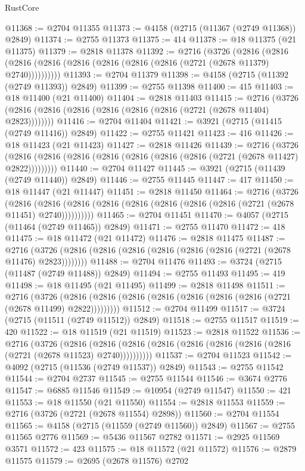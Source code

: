\begin{lexlean}{RustCore}
\begin{coremodule}
@11368 := @2704 @11355
@11373 := @4158 (@2715 (@11367 (@2749 @11368)) @2849)
@11374 := @2755 @11373
@11375 := 414
@11378 := @18 @11375 (@21 @11375)
@11379 := @2818 @11378
@11392 := @2716
    (@3726
      (@2816 (@2816 (@2816 (@2816 (@2816 (@2816 (@2816 (@2816 (@2721 (@2678 @11379) @2740))))))))))
@11393 := @2704 @11379
@11398 := @4158 (@2715 (@11392 (@2749 @11393)) @2849)
@11399 := @2755 @11398
@11400 := 415
@11403 := @18 @11400 (@21 @11400)
@11404 := @2818 @11403
@11415 := @2716 (@3726 (@2816 (@2816 (@2816 (@2816 (@2816 (@2816 (@2721 (@2678 @11404) @2823))))))))
@11416 := @2704 @11404
@11421 := @3921 (@2715 (@11415 (@2749 @11416)) @2849)
@11422 := @2755 @11421
@11423 := 416
@11426 := @18 @11423 (@21 @11423)
@11427 := @2818 @11426
@11439 := @2716
    (@3726 (@2816 (@2816 (@2816 (@2816 (@2816 (@2816 (@2816 (@2721 (@2678 @11427) @2822)))))))))
@11440 := @2704 @11427
@11445 := @3921 (@2715 (@11439 (@2749 @11440)) @2849)
@11446 := @2755 @11445
@11447 := 417
@11450 := @18 @11447 (@21 @11447)
@11451 := @2818 @11450
@11464 := @2716
    (@3726
      (@2816 (@2816 (@2816 (@2816 (@2816 (@2816 (@2816 (@2816 (@2721 (@2678 @11451) @2740))))))))))
@11465 := @2704 @11451
@11470 := @4057 (@2715 (@11464 (@2749 @11465)) @2849)
@11471 := @2755 @11470
@11472 := 418
@11475 := @18 @11472 (@21 @11472)
@11476 := @2818 @11475
@11487 := @2716 (@3726 (@2816 (@2816 (@2816 (@2816 (@2816 (@2816 (@2721 (@2678 @11476) @2823))))))))
@11488 := @2704 @11476
@11493 := @3724 (@2715 (@11487 (@2749 @11488)) @2849)
@11494 := @2755 @11493
@11495 := 419
@11498 := @18 @11495 (@21 @11495)
@11499 := @2818 @11498
@11511 := @2716
    (@3726 (@2816 (@2816 (@2816 (@2816 (@2816 (@2816 (@2816 (@2721 (@2678 @11499) @2822)))))))))
@11512 := @2704 @11499
@11517 := @3724 (@2715 (@11511 (@2749 @11512)) @2849)
@11518 := @2755 @11517
@11519 := 420
@11522 := @18 @11519 (@21 @11519)
@11523 := @2818 @11522
@11536 := @2716
    (@3726
      (@2816 (@2816 (@2816 (@2816 (@2816 (@2816 (@2816 (@2816 (@2721 (@2678 @11523) @2740))))))))))
@11537 := @2704 @11523
@11542 := @4092 (@2715 (@11536 (@2749 @11537)) @2849)
@11543 := @2755 @11542
@11544 := @2704 @2737
@11545 := @2755 @11544
@11546 := @3674 @2776
@11547 := @6885 @11546
@11549 := @10954 (@2749 @11547)
@11550 := 421
@11553 := @18 @11550 (@21 @11550)
@11554 := @2818 @11553
@11559 := @2716 (@3726 (@2721 (@2678 @11554) @2898))
@11560 := @2704 @11554
@11565 := @4158 (@2715 (@11559 (@2749 @11560)) @2849)
@11567 := @2755 @11565 @2776
@11569 := @5436 @11567 @2782
@11571 := @2925 @11569 @3571
@11572 := 423
@11575 := @18 @11572 (@21 @11572)
@11576 := @2879 @11575
@11579 := @2695 (@2678 @11576) @2702

\end{coremodule}
\end{lexlean}
